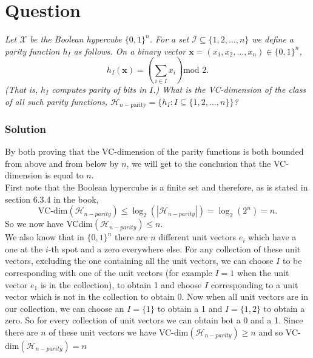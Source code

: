 \documentclass{article}
\newcounter{counterquestion}
\newenvironment{question}[1]
{
\stepcounter{counterquestion}
\section*{Question \thecounterquestion}
\emph{#1} 
} 
{
}
\newenvironment{solution}
{
\subsubsection*{Solution}
} 
{
}
\begin{document}
\begin{question}{Let $\mathcal{X}$ be the Boolean hypercube $\{0 , 1 \} ^n$. For a set $\mathcal{I} \subseteq \{ 1,2,\dots , n \}$ we define a \textit{parity function} $h_I$ as follows. On a binary vector $\textbf{x}=(x_1, x_2, \dots , x_n )\in \{ 0,1\} ^n$,
$$h_I (\textbf{x}) = \left(\sum _{i\in I} x_i \right) \text{mod 2}.$$
(That is, $h_I$ computes parity of bits in $I$.) What is the VC-dimension of the class of all such parity functions, $\mathcal{H} _{n-\text{parity}}=\{ h_I : I\subseteq \{ 1,2,\dots , n\} \}$?}
\begin{solution}
By both proving that the VC-dimension of the parity functions is both bounded from above and from below by $n$, we will get to the conclusion that the VC-dimension is equal to $n$.\\
First note that the Boolean hypercube is a finite set and therefore, as is stated in section 6.3.4 in the book, $$\text{VC-dim}(\mathcal{H}_{n-parity})\leq \log _2 (| \mathcal{H}_{n-parity}|)= \log _2 (2^n)=n.$$
So we now have VCdim$(\mathcal{H}_{n-parity}) \leq n$.\\
We also know that in $\{ 0,1 \}^n$ there are $n$ different unit vectors $e_i$ which have a one at the $i$-th spot and a zero everywhere else. For any collection of these unit vectors, excluding the one containing all the unit vectors, we can choose $I$ to be corresponding with one of the unit vectors (for example $I=1$ when the unit vector $e_1$ is in the collection), to obtain 1 and choose $I$ corresponding to a unit vector which is not in the collection to obtain 0. Now when all unit vectors are in our collection, we can choose an $I=\{1 \} $ to obtain a 1 and $I=\{ 1,2 \} $ to obtain a zero. So for every collection of unit vectors we can obtain bot a 0 and a 1. Since there are $n$ of these unit vectors we have VC-dim$(\mathcal{H} _{n-parity}) \geq n$ and so VC-dim$(\mathcal{H} _{n-parity}) = n$
\end{solution}
\end{question}
\end{document}
